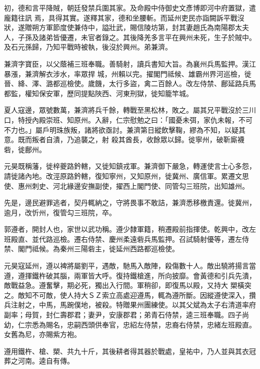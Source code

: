 \begin{pinyinscope}
 初，德和言平降賊，朝廷發禁兵圍其家。及命殿中侍御史文彥博即河中府置獄，遣龐籍往訊
 焉，具得其實。遂釋其家，德和坐腰斬。而延州吏民亦詣闕訴平戰沒狀，遂贈朔方軍節度使兼侍中，謚壯武，賜信陵坊第，封其妻趙氏為南陽郡太夫人，子孫及諸弟皆優遷，未官者錄之。其後降羌多言平在興州未死，生子於賊中。及石元孫歸，乃知平戰時被執，後沒於興州。弟兼濟。



 兼濟字寶臣，以父蔭補三班奉職。善騎射，讀兵書知大旨。為襄州兵馬監押。漢江暴漲，兼濟解衣涉水，率眾捍
 城，州賴以完。擢閣門祗候、雄霸州界河巡檢，徙晉、絳、澤、潞都巡檢使。歲饑，太行多盜，禽二百餘人。改左侍禁、鄜延路兵馬都監，權知保安軍，歷同提點陜西、河東刑獄，徙知籠竿城。



 夏人寇邊，眾號數萬，兼濟將兵千餘，轉戰至黑松林，敗之。屬其兄平戰沒於三川口，特授內殿崇班、知原州。入辭，仁宗慰勉之曰：「國憂未弭，家仇未報，不可不力也。」屬戶明珠族叛，諸將欲亟討。兼濟第日縱飲擊鞠，繆為不知，以疑其意。既而叛者自潰，乃追襲之，射
 殺其酋長，收餘眾以歸。徙寧州，破靳廝襪砦，徙鄜州。



 元昊既稱藩，徙梓夔路鈐轄，又徙知鎮戎軍。兼濟御下嚴急，轉運使言士心多怨，請徙諸內地。改涇原路鈐轄，復知寧州，又知原州，徙冀州、廣信軍。累遷文思使、惠州刺史、河北緣邊安撫副使，擢西上閣門使、同管勾三班院，出知雄州。



 先是，邊民避罪逃者，契丹輒納之，守將畏事不敢詰，兼濟悉移檄責還。徙冀州，逾月，改忻州，復管勾三班院，卒。



 郭遵者，開封人也，家世以武功稱。遵少隸軍籍，稍遷殿前指揮使。乾興中，改左班殿直、並代路巡檢。遷右侍禁、慶州柔遠砦兵馬監押。召試騎射優等，遷左侍禁、閣門祗候。為秦州三陽砦主，徙延州西路都巡檢使。



 元昊寇延州，遵以裨將屬劉平，遇敵，馳馬入敵陣，殺傷數十人。敵出驍將揚言當遵，遵揮鐵杵破其腦，兩軍皆大呼。復持鐵槍進，所向披靡。會黃德和引兵先潰，敵戰益急。遵奮擊，期必死，獨出入行間。軍稍卻，即復馬以殿，又持大
 槊橫突之。敵知不可敵，使人持大ＳＺ索立高處迎遵馬，輒為遵所斷。因縱遵使深入，攢兵注射之，中馬，馬踠僕地，被殺。特贈果州團練使。以其父斌為太子右清道率府副率；母賀，封仁壽郡君；妻尹，安康郡君；弟青石侍禁，逵三班奉職。四子尚幼，仁宗悉為賜名，忠嗣西頭供奉官，忠紹左侍禁，忠裔右侍禁，忠緒左班殿直。女舊為尼，亦賜紫方袍。



 遵用鐵杵、槍、槊、共九十斤，其後耕者得其器於戰處，皇祐中，乃人並與其衣冠葬之河南。逵自有傳。




\end{pinyinscope}
